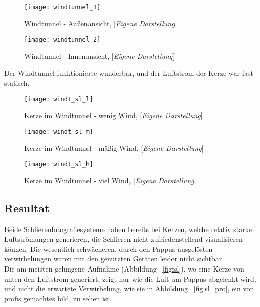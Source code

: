 \begin{figure}[h]
    \centering
    \begin{minipage}{0.55\textwidth}
        \centering
        \texttt{[image: windtunnel\_1]}
        \caption{Windtunnel - Außenansicht, [\textit{Eigene Darstellung}]}
        \label{fig:windt1}
    \end{minipage}
    \hfill
    \begin{minipage}{0.4\textwidth}
        \centering
        \texttt{[image: windtunnel\_2]}
        \caption{Windtunnel - Innenansicht, [\textit{Eigene Darstellung}]}
        \label{fig:windt2}
    \end{minipage}
\end{figure}

\noindent
Der Windtunnel funktionierte wunderbar, und der Luftstrom der Kerze war fast statisch.

\begin{figure}[h]
    \centering
    \begin{minipage}{0.3\textwidth}
        \centering
        \texttt{[image: windt\_sl\_l]}
        \caption{Kerze im Windtunnel - wenig Wind, [\textit{Eigene Darstellung}]}
        \label{fig:windt_sl_l}
    \end{minipage}
    \hfill
    \begin{minipage}{0.3\textwidth}
        \centering
        \texttt{[image: windt\_sl\_m]}
        \caption{Kerze im Windtunnel - mäßig Wind, [\textit{Eigene Darstellung}]}
        \label{fig:windt_sl_m}
    \end{minipage}
    \hfill
    \begin{minipage}{0.3\textwidth}
        \centering
        \texttt{[image: windt\_sl\_h]}
        \caption{Kerze im Windtunnel - viel Wind, [\textit{Eigene Darstellung}]}
        \label{fig:windt_sl_h}
    \end{minipage}
\end{figure}

\subsection{Resultat}\label{subsec:resultat}

Beide Schlierenfotografiesysteme haben bereits bei Kerzen, welche relativ starke Luftströmungen generieren, die Schlieren nicht zufriedenstellend visualisieren können.
Die wesentlich schwächeren, durch den Pappus ausgelösten verwirbelungen waren mit den genutzten Geräten leider nicht sichtbar.\\
Die am meisten gelungene Aufnahme (Abbildung ~\ref{fig:sl}), wo eine Kerze von unten den Luftstrom generiert,
zeigt nur wie die Luft am Pappus abgelenkt wird, und nicht die erwartete Verwirbelung,
wie sie in Abbildung ~\ref{fig:sl_pro}, ein von profis gemachtes bild, zu sehen ist.

